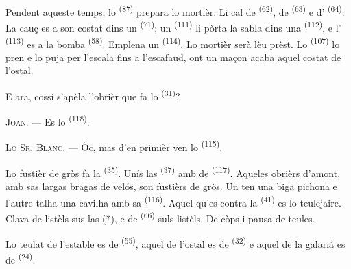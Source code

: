Pendent aqueste temps, lo  \textsuperscript{(87)} prepara lo
mortièr. Li cal de  \textsuperscript{(62)}, de 
\textsuperscript{(63)} e d' \textsuperscript{(64)}. La cauç es a son
costat dins un  \textsuperscript{(71)}; un 
\textsuperscript{(111)} li pòrta la sabla dins una 
\textsuperscript{(112)}, e l' \textsuperscript{(113)} es a la
bomba \textsuperscript{(58)}. Emplena un  \textsuperscript{(114)}. Lo
mortièr serà lèu prèst. Lo  \textsuperscript{(107)}
lo pren e lo puja per l'escala fins a l'escafaud, ont un maçon acaba aquel costat
de l'ostal.

E ara, cossí s'apèla l'obrièr que fa lo 
\textsuperscript{(31)}?

\textsc{Joan}. --- Es lo  \textsuperscript{(118)}.

\VUsaut{3.0mm}
\VUsaut{3.0mm}

\textsc{Lo Sr. Blanc}. --- Òc, mas d'en primièr ven lo 
\textsuperscript{(115)}.

Lo fustièr de gròs fa la  \textsuperscript{(35)}. Unís las
 \textsuperscript{(37)} amb de 
\textsuperscript{(117)}. Aqueles obrièrs d'amont, amb sas largas bragas de velós,
son fustièrs de gròs. Un ten una biga pichona e l'autre talha una cavilha amb sa
 \textsuperscript{(116)}. Aquel qu'es contra la
 \textsuperscript{(41)} es lo teulejaire. Clava de listèls sus
las  (*), e de  \textsuperscript{(66)} suls listèls.
De còps i pausa de teules.


Lo teulat de l'estable es de  \textsuperscript{(55)}, aquel de
l'ostal es de  \textsuperscript{(32)} e aquel de la galariá es de
 \textsuperscript{(24)}.

